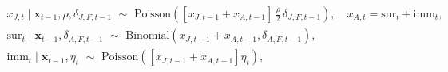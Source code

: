 \begin{gather}
    x_{J, t} \mid \boldsymbol{x}_{t - 1}, \rho, \delta_{J, F, t - 1}
    \,\, \sim \,\,
    \text{Poisson}\left(
      \left[x_{J, t - 1} + x_{A, t - 1}\right]
      \, \frac{\rho}{2} \,
      \delta_{J, F, t - 1}
    \right),
    \quad
    x_{A, t} = \text{sur}_{t} + \text{imm}_{t}, \\
    \text{sur}_{t} \mid \boldsymbol{x}_{t - 1}, \delta_{A, F, t - 1}
    \,\, \sim \,\,
    \text{Binomial}\left(
      x_{J, t - 1} + x_{A, t - 1},
      \delta_{A, F, t - 1}
    \right), \\
    \text{imm}_{t} \mid \boldsymbol{x}_{t - 1}, \eta_{t}
    \,\, \sim\,\,
    \text{Poisson}\left(
      \left[x_{J, t - 1} + x_{A, t - 1}\right] \eta_{t}\right
    ),
  \label{eqn:count-data-submodel}
\end{gather}